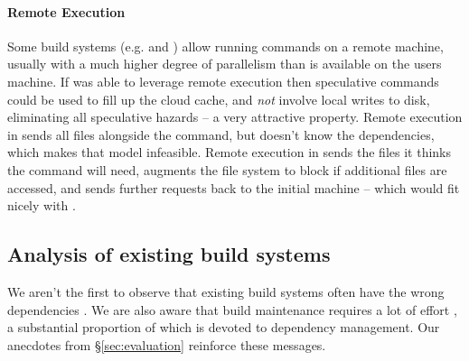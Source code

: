 \paragraph{Remote Execution} Some build systems (e.g. \Bazel and \BuildXL \cite{build}) allow running commands on a remote machine, usually with a much higher degree of parallelism than is available on the users machine. If \Rattle was able to leverage remote execution then speculative commands could be used to fill up the cloud cache, and \emph{not} involve local writes to disk, eliminating all speculative hazards -- a very attractive property. Remote execution in \Bazel sends all files alongside the command, but \Rattle doesn't know the dependencies, which makes that model infeasible. Remote execution in \BuildXL sends the files it thinks the command will need, augments the file system to block if additional files are accessed, and sends further requests back to the initial machine -- which would fit nicely with \Rattle.

\subsection{Analysis of existing build systems}

We aren't the first to observe that existing build systems often have the wrong dependencies \cite{detecting_incorrect_build_rules}. We are also aware that build maintenance requires a lot of effort \cite{build_maintenance}, a substantial proportion of which is devoted to dependency management. Our anecdotes from \S\ref{sec:evaluation} reinforce these messages.

\begin{comment}
\subsection{Other related work}

The notion of hazards is used extensively in processor design. This is standard terminology.
\end{comment}
